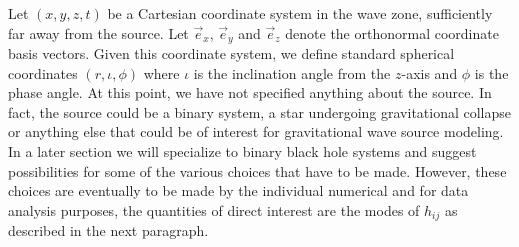 \documentclass{article}
\numberwithin{equation}{section}
\newcommand{\xhat}{\vec{e}_x}
\newcommand{\yhat}{\vec{e}_y}
\newcommand{\zhat}{\vec{e}_z}
\begin{document}
Let $(x,y,z,t)$ be a Cartesian coordinate system in the wave zone,
sufficiently far away from the source. Let $\xhat$, $\yhat$ and
$\zhat$ denote the orthonormal coordinate basis vectors.  Given this
coordinate system, we define standard spherical coordinates
$(r,\iota,\phi)$ where $\iota$ is the inclination angle from the
$z$-axis and $\phi$ is the phase angle.  At this point, we have not
specified anything about the source.  In fact, the source could be a
binary system, a star undergoing gravitational collapse or anything
else that could be of interest for gravitational wave source
modeling.  In a later section we will specialize to binary black hole
systems and suggest possibilities for some of the various choices that
have to be made.  However, these choices are eventually to be made by
the individual numerical and for data analysis purposes, the
quantities of direct interest are the modes of $h_{ij}$ as described
in the next paragraph.
\end{document}
